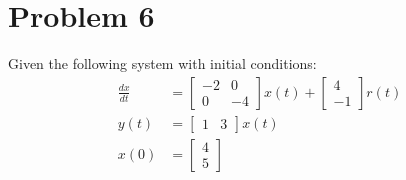\documentclass{article}
\begin{document}
\newpage
\section*{Problem 6}
Given the following system with initial conditions:
\begin{align*}
\frac{dx}{dt} &= \begin{bmatrix} -2 & 0 \\ 0 & -4 \end{bmatrix} x(t) + \begin{bmatrix} 4 \\ -1 \end{bmatrix} r(t) \\
y(t) &= \begin{bmatrix} 1 & 3 \end{bmatrix} x(t) \\
x(0) &= \begin{bmatrix} 4 \\ 5 \end{bmatrix} \\
\end{align*}
\end{document}
